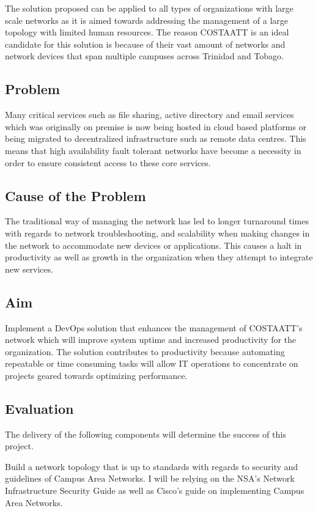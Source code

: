 \documentclass[12pt, letterpaper]{article}
\begin{document}
\medskip

The solution proposed can be applied to all types of organizations with large scale networks as it is aimed towards addressing the management of a large topology with limited human resources. The reason COSTAATT is an ideal candidate for this solution is because of their vast amount of networks and network devices that span multiple campuses across Trinidad and Tobago. 
	
	\subsection{Problem}
Many critical services such as file sharing, active directory and email services which was originally on premise is now being hosted in cloud based platforms or being migrated to decentralized infrastructure such as remote data centres. This means that high availability fault tolerant networks have become a necessity in order to ensure consistent access to these core services.

	\subsection{Cause of the Problem}
The traditional way of managing the network has led to longer turnaround times with regards to network troubleshooting, and scalability when making changes in the network to accommodate new devices or applications. This causes a halt in productivity as well as growth in the organization when they attempt to integrate new services. 
	
	
	\subsection{Aim}
Implement a DevOps solution that enhances the management of COSTAATT's network which will improve system uptime and increased productivity for the organization. The solution contributes to productivity because automating repeatable or time consuming tasks will allow IT operations to concentrate on projects geared towards optimizing performance.

\newpage
	\subsection{Evaluation}
The delivery of the following components will determine the success of this project.

\medskip

Build a network topology that is up to standards with regards to security and guidelines of Campus Area Networks. I will be relying on the NSA’s Network Infrastructure Security Guide as well as Cisco’s guide on implementing Campus Area Networks. 
\end{document}
